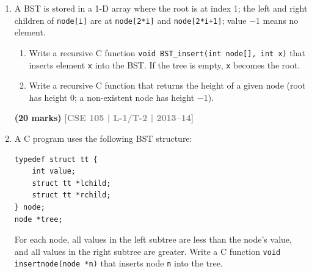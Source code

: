 \documentclass[12pt,a3paper]{article}
\newcommand{\yr}[1]{\hfill\textcolor{gray}{\small\textbf{[#1]}}}
\newcommand{\mk}[1]{\textcolor{orange!70!black}{\small\textbf{(#1 marks)}}}
\begin{document}
\begin{enumerate}
\begin{enumerate}
    Given description of a particular binary expression tree, you need to construct it using
    self referential data structure (i.e. a structure definition which includes at least one
    member that is a pointer to the structure of its own kind). Store the root of the tree in a
    local variable called \texttt{root}.

    \textbf{Do not use global variables.} \mk{20}

    \item Postfix notation is a mathematical notation in which every operator follows all of its
    operands. An expression in postfix notation is parenthesis-free. For example, for the infix
    expression $(((2+3)*9)+7)$, the expression in postfix notation is: \texttt{2 3 + 9 * 7 +}.
    Using the expression tree, constructed in 8(a) and represented by the variable \texttt{root}, write necessary
    code to produce the expression in postfix notation. There should be a space printed after
    printing each operator/operand.\mk{10}
  \end{enumerate} 
 \yr{CSE 105 | L-1/T-2 | 2014--15}



\item A BST is stored in a 1-D array where the root is at index 1; the left and right children of \texttt{node[i]} are at \texttt{node[2*i]} and \texttt{node[2*i+1]}; value $-1$ means no element.
\begin{enumerate}
  \item Write a recursive C function \texttt{void BST\_insert(int node[], int x)} that inserts element \texttt{x} into the BST. If the tree is empty, \texttt{x} becomes the root.
  \item Write a recursive C function that returns the height of a given node (root has height 0; a non-existent node has height $-1$).
\end{enumerate}
\mk{20} \yr{CSE 105 | L-1/T-2 | 2013--14}

\item A C program uses the following BST structure:
\begin{lstlisting}
typedef struct tt {
    int value;
    struct tt *lchild;
    struct tt *rchild;
} node;
node *tree;
\end{lstlisting}
For each node, all values in the left subtree are less than the node's value, and all values in the right subtree are greater. Write a C function \texttt{void insertnode(node *n)} that inserts node \texttt{n} into the tree.
 

\end{enumerate}
\end{document}
